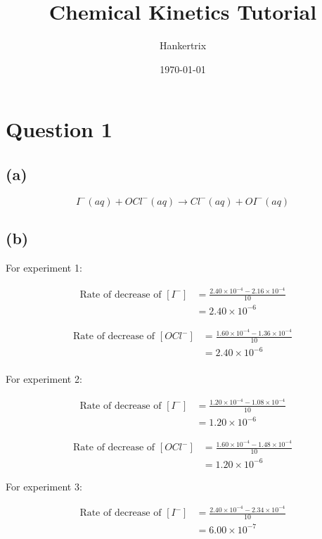\documentclass[11pt]{article}
\author{Hankertrix}
\date{\today}
\title{Chemical Kinetics Tutorial}
\begin{document}
\maketitle
\setcounter{tocdepth}{2}
\tableofcontents

\newpage

\section{Question 1}
\label{sec:orge7fb205}

\subsection{(a)}
\label{sec:orgdd78588}

\[I^- (aq) + OCl^- (aq) \rightarrow Cl^- (aq) + OI^- (aq)\]

\subsection{(b)}
\label{sec:org1386dc6}
For experiment 1:

\begin{align*}
\text{Rate of decrease of } [I^-] &= \frac{2.40 \times 10^{-4} - 2.16 \times 10^{-4}}{10} \\
&= 2.40 \times 10^{-6}
\end{align*}

\begin{align*}
\text{Rate of decrease of } [OCl^-] &= \frac{1.60 \times 10^{-4} - 1.36 \times 10^{-4}}{10} \\
&= 2.40 \times 10^{-6}
\end{align*}
\\[0pt]

For experiment 2:

\begin{align*}
\text{Rate of decrease of } [I^-] &= \frac{1.20 \times 10^{-4} - 1.08 \times 10^{-4}}{10} \\
&= 1.20 \times 10^{-6}
\end{align*}

\begin{align*}
\text{Rate of decrease of } [OCl^-] &= \frac{1.60 \times 10^{-4} - 1.48 \times 10^{-4}}{10} \\
&= 1.20 \times 10^{-6}
\end{align*}

\newpage

For experiment 3:

\begin{align*}
\text{Rate of decrease of } [I^-] &= \frac{2.40 \times 10^{-4} - 2.34 \times 10^{-4}}{10} \\
&= 6.00 \times 10^{-7}
\end{align*}
\end{document}
